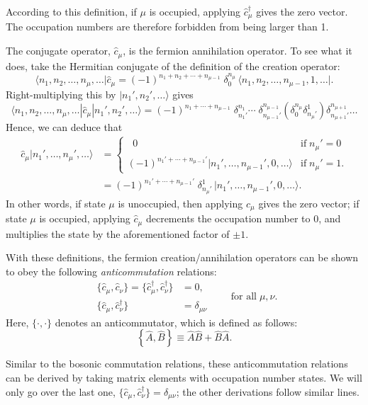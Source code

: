 \documentclass[pra,12pt]{revtex4}
\begin{document}
According to this definition, if $\mu$ is occupied, applying
$\hat{c}_\mu^\dagger$ gives the zero vector.  The occupation numbers
are therefore forbidden from being larger than 1.

The conjugate operator, $\hat{c}_\mu$, is the fermion annihilation
operator.  To see what it does, take the Hermitian conjugate of the
definition of the creation operator:
$$\langle n_1, n_2, \dots, n_\mu,\dots| \hat{c}_\mu  =
(-1)^{n_1 + n_2 + \cdots + n_{\mu-1}}\; \delta^{n_\mu}_0\, \big\langle n_1, n_2, \dots, n_{\mu-1}, 1, \dots\big|.$$
Right-multiplying this by $|n_1',n_2',\dots\rangle$ gives
$$\langle n_1, n_2, \dots, n_\mu,\dots| \hat{c}_\mu |n_1', n_2', \dots\rangle  = (-1)^{n_1 + \cdots + n_{\mu-1}} \;\delta^{n_1}_{n_1'} \cdots \;\delta^{n_{\mu-1}}_{n_{\mu-1}'} \left(\delta^{n_\mu}_0 \delta^1_{n_\mu'} \right) \delta^{n_{\mu+1}}_{n_{\mu+1}'} \dots$$
Hence, we can deduce that
$$\begin{aligned}\hat{c}_\mu |n_1', \dots, n_\mu',\dots\rangle &= \begin{cases} \;\;0 & \mathrm{if}\; n_\mu' = 0 \\ (-1)^{n_1' + \cdots + n_{\mu-1}'} |n_1', \dots, n_{\mu-1}', 0, \dots\rangle & \mathrm{if} \; n_\mu' = 1. \end{cases} \\ &= (-1)^{n_1' + \cdots + n_{\mu-1}'} \; \delta^1_{n_\mu'} \, \big|n_1', \dots, n_{\mu-1}', 0, \dots\big\rangle.\end{aligned}$$
In other words, if state $\mu$ is unoccupied, then applying
$\hat{c}_\mu$ gives the zero vector; if state $\mu$ is occupied,
applying $\hat{c}_\mu$ decrements the occupation number to $0$, and
multiplies the state by the aforementioned factor of $\pm 1$.

With these definitions, the fermion creation/annihilation operators
can be shown to obey the following \textit{anticommutation} relations:
$$\boxed{\quad\begin{aligned}\,\big\{\hat{c}_\mu,\hat{c}_\nu\big\} = \big\{\hat{c}_\mu^\dagger,\hat{c}_\nu^\dagger\big\} &= 0, \\ \,\big\{\hat{c}_\mu,\hat{c}_\nu^\dagger\big\} &= \delta_{\mu\nu}\end{aligned}\qquad\textrm{for all}\;\mu,\nu.\quad}$$
Here, $\{\cdot,\cdot\}$ denotes an anticommutator, which is defined as
follows:
$$\left\{\hat{A},\hat{B}\right\} \equiv \hat{A}\hat{B} + \hat{B}\hat{A}.$$

Similar to the bosonic commutation relations, these anticommutation
relations can be derived by taking matrix elements with occupation
number states.  We will only go over the last one,
$\big\{\hat{c}_\mu,\hat{c}_\nu^\dagger\big\} = \delta_{\mu\nu}$; the
other derivations follow similar lines.
\end{document}
